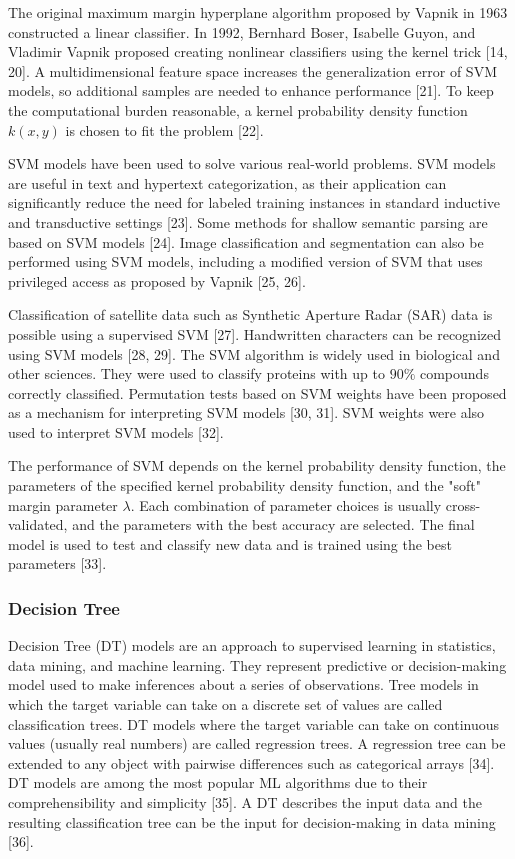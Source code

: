 \documentclass[sn-mathphys-num]{sn-jnl}%
\begin{document}
The original maximum margin hyperplane algorithm proposed by Vapnik in 1963 constructed a linear classifier. In 1992, Bernhard Boser, Isabelle Guyon, and Vladimir Vapnik proposed creating nonlinear classifiers using the kernel trick [14, 20]. A multidimensional feature space increases the generalization error of SVM models, so additional samples are needed to enhance performance [21]. To keep the computational burden reasonable, a kernel probability density function $k(x, y)$ is chosen to fit the problem [22].

SVM models have been used to solve various real-world problems. SVM models are useful in text and hypertext categorization, as their application can significantly reduce the need for labeled training instances in standard inductive and transductive settings [23]. Some methods for shallow semantic parsing are based on SVM models [24]. Image classification and segmentation can also be performed using SVM models, including a modified version of SVM that uses privileged access as proposed by Vapnik [25, 26].

Classification of satellite data such as Synthetic Aperture Radar (SAR) data is possible using a supervised SVM [27]. Handwritten characters can be recognized using SVM models [28, 29]. The SVM algorithm is widely used in biological and other sciences. They were used to classify proteins with up to $90\%$ compounds correctly classified. Permutation tests based on SVM weights have been proposed as a mechanism for interpreting SVM models [30, 31]. SVM weights were also used to interpret SVM models [32].

The performance of SVM depends on the kernel probability density function, the parameters of the specified kernel probability density function, and the "soft" margin parameter $\lambda$. Each combination of parameter choices is usually cross-validated, and the parameters with the best accuracy are selected. The final model is used to test and classify new data and is trained using the best parameters [33].

\subsubsection{Decision Tree}

Decision Tree (DT) models are an approach to supervised learning in statistics, data mining, and machine learning. They represent predictive or decision-making model used to make inferences about a series of observations. Tree models in which the target variable can take on a discrete set of values are called classification trees. DT models where the target variable can take on continuous values (usually real numbers) are called regression trees. A regression tree can be extended to any object with pairwise differences such as categorical arrays [34]. DT models are among the most popular ML algorithms due to their comprehensibility and simplicity [35]. A DT describes the input data and the resulting classification tree can be the input for decision-making in data mining [36].
\end{document}
